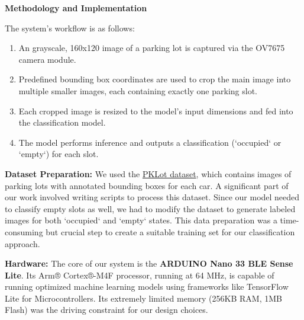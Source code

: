 \documentclass[sigconf,10pt,nonacm]{acmart}
\begin{document}
\noindent\textbf{Methodology and Implementation}

The system's workflow is as follows:
\begin{enumerate}
    \item An grayscale, 160x120 image of a parking lot is captured via the OV7675 camera module. 
    \item Predefined bounding box coordinates are used to crop the main image into multiple smaller images, each containing exactly one parking slot.
    \item Each cropped image is resized to the model's input dimensions and fed into the classification model.
    \item The model performs inference and outputs a classification (`occupied` or `empty`) for each slot.
\end{enumerate}

\noindent\textbf{Dataset Preparation:} We used the \href{https://public.roboflow.com/object-detection/pklot/2}{PKLot dataset}, which contains images of parking lots with annotated bounding boxes for each car. A significant part of our work involved writing scripts to process this dataset. Since our model needed to classify empty slots as well, we had to modify the dataset to generate labeled images for both `occupied` and `empty` states. This data preparation was a time-consuming but crucial step to create a suitable training set for our classification approach.

\noindent\textbf{Hardware:} The core of our system is the \textbf{ARDUINO Nano 33 BLE Sense Lite}. Its Arm® Cortex®-M4F processor, running at 64 MHz, is capable of running optimized machine learning models using frameworks like TensorFlow Lite for Microcontrollers. Its extremely limited memory (256KB RAM, 1MB Flash) was the driving constraint for our design choices.
\end{document}
